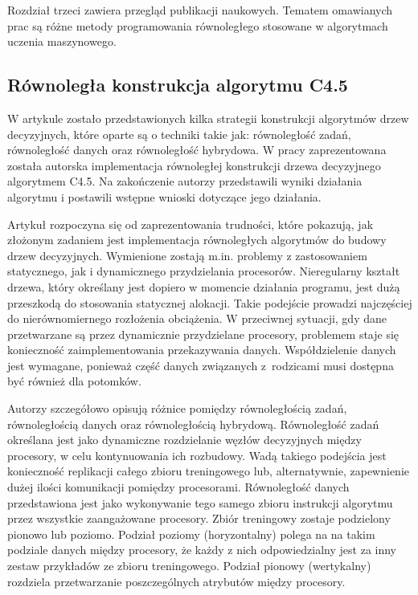 \documentclass[12pt]{article}
\begin{document}
Rozdział trzeci zawiera przegląd publikacji naukowych. Tematem omawianych prac są różne metody programowania równoległego stosowane
w algorytmach uczenia maszynowego.

\subsection{Równoległa konstrukcja algorytmu C4.5}

W artykule \cite{parallel-implementation-decision-tree} zostało przedstawionych kilka strategii konstrukcji algorytmów drzew decyzyjnych, które oparte są o techniki takie jak: równoległość zadań,
równoległość danych oraz równoległość hybrydowa. W pracy zaprezentowana została autorska implementacja równoległej konstrukcji drzewa
decyzyjnego algorytmem C4.5. Na zakończenie autorzy przedstawili wyniki działania algorytmu i postawili wstępne wnioski dotyczące jego działania.

Artykuł rozpoczyna się od zaprezentowania trudności, które pokazują, jak złożonym zadaniem jest implementacja równoległych
algorytmów do budowy drzew decyzyjnych. Wymienione zostają m.in. problemy z zastosowaniem statycznego, jak i dynamicznego przydzielania procesorów.
Nieregularny kształt drzewa, który określany jest dopiero w momencie działania programu, jest dużą przeszkodą do stosowania statycznej alokacji. Takie podejście prowadzi
najczęściej do nierównomiernego rozłożenia obciążenia. W przeciwnej sytuacji, gdy dane przetwarzane są przez dynamicznie przydzielane procesory, problemem staje się
konieczność zaimplementowania przekazywania danych. Współdzielenie danych jest wymagane, ponieważ część danych związanych z~rodzicami musi dostępna być również dla potomków.

Autorzy szczegółowo opisują różnice pomiędzy równoległością zadań, równoległością danych oraz równoległością hybrydową. Równoległość zadań określana jest
jako dynamiczne rozdzielanie węzłów decyzyjnych między procesory, w celu kontynuowania ich rozbudowy. Wadą takiego podejścia jest konieczność replikacji całego zbioru
treningowego lub, alternatywnie, zapewnienie dużej ilości komunikacji pomiędzy procesorami. Równoległość danych przedstawiona jest jako wykonywanie tego samego zbioru instrukcji
algorytmu przez wszystkie zaangażowane procesory. Zbiór treningowy zostaje podzielony pionowo lub poziomo. Podział poziomy (horyzontalny) polega na na takim podziale danych między procesory, że
każdy z nich odpowiedzialny jest za inny zestaw przykładów ze zbioru treningowego. Podział pionowy (wertykalny) rozdziela przetwarzanie poszczególnych atrybutów między procesory.
\end{document}

